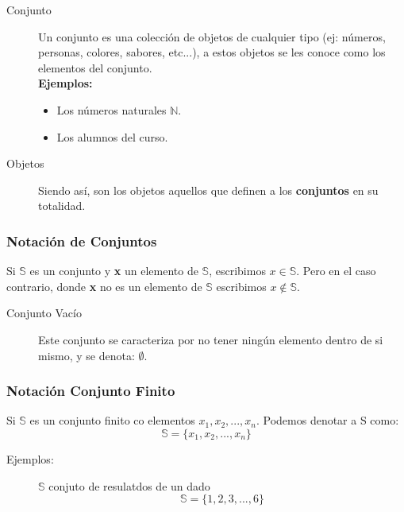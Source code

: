 \documentclass[a4paper,dvipsnames]{book}
\begin{document}
    \begin{description}
        \item[Conjunto] Un conjunto es una colección de objetos de cualquier
            tipo (ej: números, personas, colores, sabores, etc...), a estos
            objetos se les  conoce como los elementos del conjunto.\\
            \textbf{Ejemplos:}
            \begin{itemize}
                \item Los números naturales $\mathbb N$.
                \item Los alumnos del curso.
            \end{itemize}
        \item[Objetos] Siendo así, son los objetos aquellos que definen a los
            \textbf{conjuntos} en su totalidad.
    \end{description}
    \subsubsection{Notación de Conjuntos}


        Si $\mathbb S$ es un conjunto y \textbf{x} un elemento de $\mathbb S$,
        escribimos $x\in \mathbb S$. Pero en el caso contrario, donde
        \textbf{x} no es un elemento de $\mathbb S$ escribimos $x\notin \mathbb
        S$.

    \begin{description}
        \item[Conjunto Vacío] Este conjunto se caracteriza por no tener ningún
            elemento dentro de si mismo, y se denota: $\emptyset$.
    \end{description}

    \subsubsection{Notación Conjunto Finito}


        Si $ \mathbb S $ es un conjunto finito co elementos $ x_1,x_2,...,x_n
        $. Podemos denotar a S como:
        \begin{equation*}

            \mathbb S = \{x_1,x_2,...,x_n\}
        \end{equation*}

    \begin{description}
        \item[Ejemplos:] $ \mathbb S $ conjuto de resulatdos de un dado
            \begin{equation*}

                \mathbb S=\{1,2,3,...,6\}
            \end{equation*}
    \end{description}
\end{document}
